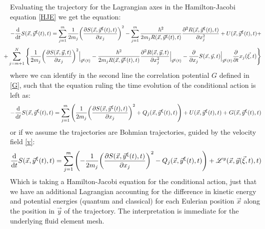 \documentclass[11pt, a4paper]{article} %
\newcommand{\Lg}{\mathscr{L}}
\begin{document}
Evaluating the trajectory for the Lagrangian axes in the Hamilton-Jacobi equation \eqref{HJE} we get the equation:
\begin{equation}
-\dv{}{t}S(\vec{x}, \vec{y}^\xi(t),t)=\sum_{j=1}^m\frac{1}{2m_j}\qty(\pdv{S(\vec{x},\vec{y}^\xi(t),t)}{x_j})^2-\sum_{j=1}^m \frac{\hbar^2}{2m_jR(\vec{x},\vec{y}^\xi(t),t)}\pdv[2]{R(\vec{x},\vec{y}^\xi(t),t)}{x_j}+U(\vec{x},\vec{y}^\xi(t),t)+
\end{equation}
$$
\hspace{-0.4cm} +\sum_{j=m+1}^N\qty{\frac{1}{2m_j}\qty(\pdv{S(\vec{x},\vec{y},t)}{x_j})^2\Big\rvert_{\vec{y}^\xi(t)}-\frac{\hbar^2}{2m_jR(\vec{x},\vec{y}^\xi(t),t)}\pdv[2]{R(\vec{x},\vec{y},t)}{x_j}\Big\rvert_{\vec{y}^\xi(t)}-\pdv{}{x_j}S(\vec{x},\vec{y},t)\Big\rvert_{\vec{y}^\xi(t)}\pdv{}{t}x_j(\vec{\xi},t)}
$$
where we can identify in the second line the correlation potential $G$ defined in \eqref{G}, such that the equation ruling the time evolution of the conditional action is left as:
\begin{equation}\label{HJE.EL}
-\dv{}{t}S(\vec{x}, \vec{y}^\xi(t),t)=\sum_{j=1}^m\qty(\frac{1}{2m_j}\qty(\pdv{S(\vec{x},\vec{y}^\xi(t),t)}{x_j})^2+Q_j(\vec{x},\vec{y}^\xi(t),t))+U(\vec{x},\vec{y}^\xi(t),t)+G(\vec{x},\vec{y}^\xi(t),t)
\end{equation}
or if we assume the trajectories are Bohmian trajectories, guided by the velocity field \eqref{v}:
\begin{equation}\label{HJE.EL.Bohm}
\dv{}{t}S(\vec{x}, \vec{y}^\xi(t),t)=\sum_{j=1}^m\qty(-\frac{1}{2m_j}\qty(\pdv{S(\vec{x},\vec{y}^\xi(t),t)}{x_j})^2-Q_j(\vec{x},\vec{y}^\xi(t),t))+\Lg^y(\vec{x},\vec{y}(\vec{\xi},t),t) 
\end{equation}
Which is taking a Hamilton-Jacobi equation for the conditional action, just that we have an additional Lagrangian accounting for the difference in kinetic energy and potential energies (quantum and classical) for each Eulerian position $\vec{x}$ along the position in $\vec{y}$ of the trajectory. The interpretation is immediate for the underlying fluid element mesh.
\end{document}
